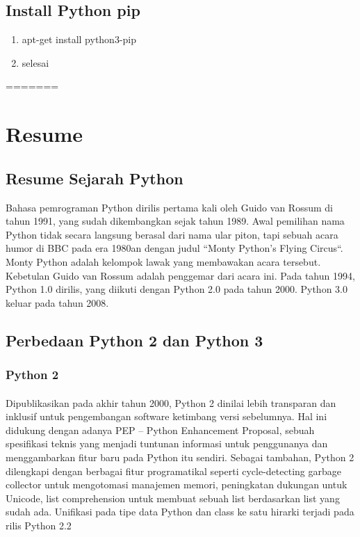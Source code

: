 \subsection{Install Python pip}
\begin{enumerate}
\item apt-get install python3-pip
\item selesai
\end{enumerate}



=======

\section{Resume}
\subsection{Resume Sejarah Python}
\begin{flushleft}
\qquad Bahasa pemrograman Python dirilis pertama kali oleh Guido van Rossum di tahun 1991, yang sudah dikembangkan sejak tahun 1989. Awal pemilihan nama Python tidak secara langsung berasal dari nama ular piton, tapi sebuah acara humor di BBC pada era 1980an dengan judul “Monty Python’s Flying Circus“. Monty Python adalah kelompok lawak yang membawakan acara tersebut. Kebetulan Guido van Rossum adalah penggemar dari acara ini. Pada tahun 1994, Python 1.0 dirilis, yang diikuti dengan Python 2.0 pada tahun 2000. Python 3.0 keluar pada tahun 2008.
\end{flushleft}
\subsection{Perbedaan Python 2 dan Python 3}
\subsubsection{Python 2}
\paragraph{}
Dipublikasikan pada akhir tahun 2000, Python 2 dinilai lebih transparan dan inklusif untuk pengembangan software ketimbang versi sebelumnya. Hal ini didukung dengan adanya PEP – Python Enhancement Proposal, sebuah spesifikasi teknis yang menjadi tuntunan informasi untuk penggunanya dan menggambarkan fitur baru pada Python itu sendiri. Sebagai tambahan, Python 2 dilengkapi dengan berbagai fitur programatikal seperti cycle-detecting garbage collector untuk mengotomasi manajemen memori, peningkatan dukungan untuk Unicode, list comprehension untuk membuat sebuah list berdasarkan list yang sudah ada. Unifikasi pada tipe data Python dan class ke satu hirarki terjadi pada rilis Python 2.2
